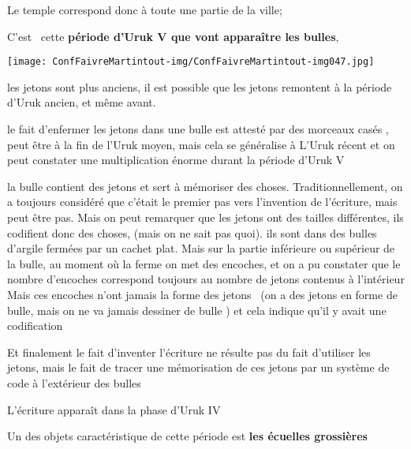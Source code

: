 \documentclass[a4paper]{article}
\begin{document}
{
Le temple correspond donc à toute une partie de la ville;}


\bigskip


\bigskip

{
C'est \ cette \textbf{période d'Uruk V que vont apparaître les bulles},
}


\bigskip


\bigskip


\texttt{[image: ConfFaivreMartintout-img/ConfFaivreMartintout-img047.jpg]}



\bigskip

{
les jetons sont plus anciens, il est possible que les jetons remontent à
la période d'Uruk ancien, et même avant.}

{
le fait d'enfermer les jetons dans une bulle est attesté par des
morceaux casés , peut être à la fin de l'Uruk moyen, mais cela se
généralise à L'Uruk récent et on peut constater une multiplication
énorme durant la période d'Uruk V}


\bigskip

{
la bulle contient des jetons et sert à mémoriser des choses.
Traditionnellement, on a toujours considéré que c'était le premier pas
vers l'invention de l'écriture, mais peut être pas. Mais on peut
remarquer que les jetons ont des tailles différentes, ils codifient
donc des choses, (mais on ne sait pas quoi). ils sont dans des bulles
d'argile fermées par un cachet plat. Mais sur la partie inférieure ou
supérieur de la bulle, au moment où la ferme on met des encoches, et on
a pu constater que le nombre d'encoches correspond toujours au nombre
de jetons contenus à l'intérieur Mais ces encoches n'ont jamais la
forme des jetons \ (on a des jetons en forme de bulle, mais on ne va
jamais dessiner de bulle ) et cela indique qu'il y avait une
codification}

{
Et finalement le fait d'inventer l'écriture ne résulte pas du fait
d'utiliser les jetons, mais le fait de tracer une mémorisation de ces
jetons par un système de code à l'extérieur des bulles}


\bigskip

{
L'écriture apparaît dans la phase d'Uruk IV}


\bigskip

{
Un des objets caractéristique de cette période est \textbf{les écuelles
grossières}}
\end{document}

